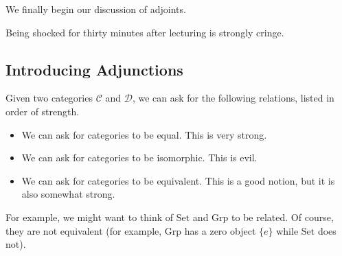 
We finally begin our discussion of adjoints.
\begin{remark}
	Being shocked for thirty minutes after lecturing is strongly cringe.
\end{remark}

\subsection{Introducing Adjunctions}
Given two categories $\mathcal C$ and $\mathcal D$, we can ask for the following relations, listed in order of strength.
\begin{itemize}
	\item We can ask for categories to be equal. This is very strong.
	\item We can ask for categories to be isomorphic. This is evil.
	\item We can ask for categories to be equivalent. This is a good notion, but it is also somewhat strong.
\end{itemize}
For example, we might want to think of $\mathrm{Set}$ and $\mathrm{Grp}$ to be related. Of course, they are not equivalent (for example, $\mathrm{Grp}$ has a zero object $\{e\}$ while $\mathrm{Set}$ does not).

